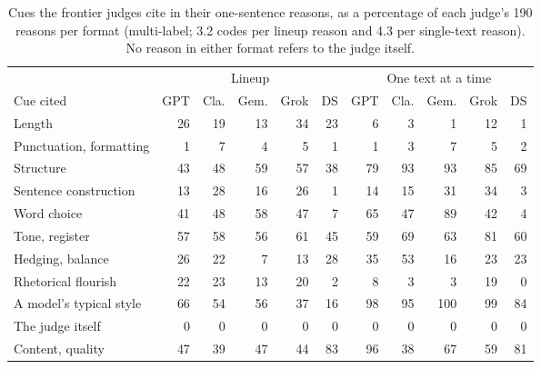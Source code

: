 \begin{table}[t]
\centering\small
\setlength\tabcolsep{4pt}
\begin{adjustbox}{max width=\linewidth}
\begin{tabular}{l rrrrr rrrrr}
\toprule
 & \multicolumn{5}{c}{Lineup} & \multicolumn{5}{c}{One text at a time} \\
\cmidrule(lr){2-6}\cmidrule(lr){7-11}
Cue cited & GPT & Cla. & Gem. & Grok & DS & GPT & Cla. & Gem. & Grok & DS \\
\midrule
Length & 26 & 19 & 13 & 34 & 23 & 6 & 3 & 1 & 12 & 1 \\
Punctuation, formatting & 1 & 7 & 4 & 5 & 1 & 1 & 3 & 7 & 5 & 2 \\
Structure & 43 & 48 & 59 & 57 & 38 & 79 & 93 & 93 & 85 & 69 \\
Sentence construction & 13 & 28 & 16 & 26 & 1 & 14 & 15 & 31 & 34 & 3 \\
Word choice & 41 & 48 & 58 & 47 & 7 & 65 & 47 & 89 & 42 & 4 \\
Tone, register & 57 & 58 & 56 & 61 & 45 & 59 & 69 & 63 & 81 & 60 \\
Hedging, balance & 26 & 22 & 7 & 13 & 28 & 35 & 53 & 16 & 23 & 23 \\
Rhetorical flourish & 22 & 23 & 13 & 20 & 2 & 8 & 3 & 3 & 19 & 0 \\
A model's typical style & 66 & 54 & 56 & 37 & 16 & 98 & 95 & 100 & 99 & 84 \\
The judge itself & 0 & 0 & 0 & 0 & 0 & 0 & 0 & 0 & 0 & 0 \\
Content, quality & 47 & 39 & 47 & 44 & 83 & 96 & 38 & 67 & 59 & 81 \\
\bottomrule
\end{tabular}
\end{adjustbox}
\caption{Cues the frontier judges cite in their one-sentence reasons, as a percentage of each judge's 190 reasons per format (multi-label; 3.2 codes per lineup reason and 4.3 per single-text reason). No reason in either format refers to the judge itself.}
\label{tab:cues}
\end{table}
